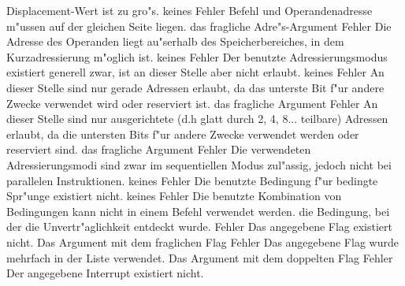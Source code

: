 \documentclass[12pt,a4paper,twoside]{report}
\begin{document}
\begin{description}
{                Displacement-Wert ist zu gro"s.}
               {keines}
               {Fehler}
               {Befehl und Operandenadresse m"ussen
                auf der gleichen Seite liegen.}
               {das fragliche Adre"s-Argument}
               {Fehler}
               {Die Adresse des Operanden liegt au"serhalb des
                Speicherbereiches, in dem Kurzadressierung m"oglich ist.}
               {keines}
               {Fehler}
               {Der benutzte Adressierungsmodus existiert
                generell zwar, ist an dieser Stelle aber nicht erlaubt.}
               {keines}
               {Fehler}
               {An dieser Stelle sind nur gerade Adressen erlaubt,
                da das unterste Bit f"ur andere Zwecke verwendet wird
                oder reserviert ist.}
               {das fragliche Argument}
               {Fehler}
               {An dieser Stelle sind nur ausgerichtete
                (d.h glatt durch 2, 4, 8... teilbare) Adressen erlaubt,
                da die untersten Bits f"ur andere Zwecke verwendet werden
                oder reserviert sind.}
               {das fragliche Argument}
               {Fehler}
               {Die verwendeten Adressierungsmodi
                sind zwar im sequentiellen Modus zul"assig, jedoch nicht
                bei parallelen Instruktionen.}
               {keines}
               {Fehler}
               {Die benutzte Bedingung f"ur bedingte Spr"unge
                existiert nicht.}
               {keines}
               {Fehler}
               {Die benutzte Kombination von Bedingungen kann nicht
                in einem Befehl verwendet werden.}
               {die Bedingung, bei der die Unvertr"aglichkeit
                entdeckt wurde.}
               {Fehler}
               {Das angegebene Flag existiert nicht.}
               {Das Argument mit dem fraglichen Flag}
               {Fehler}
               {Das angegebene Flag wurde mehrfach in der Liste verwendet.}
               {Das Argument mit dem doppelten Flag}
               {Fehler}
               {Der angegebene Interrupt existiert nicht.}

\end{description}
\end{document}
